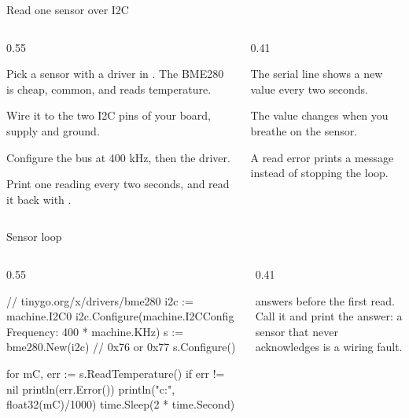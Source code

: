 \documentclass[10pt,aspectratio=169,t]{beamer}
\begin{document}
\begin{frame}[embedded,eyebrow=Task I]{Read one sensor over I2C}
  \begin{columns}[T]
    \begin{column}{0.55\textwidth}
      \begin{steps}
        \item Pick a sensor with a driver in . The BME280 is cheap, common, and reads temperature.
        \item Wire it to the two I2C pins of your board, supply and ground.
        \item Configure the bus at 400 kHz, then the driver.
        \item Print one reading every two seconds, and read it back with .
      \end{steps}
    \end{column}
    \begin{column}{0.41\textwidth}
      \begin{checklist}
        \item The serial line shows a new value every two seconds.
        \item The value changes when you breathe on the sensor.
        \item A read error prints a message instead of stopping the loop.
      \end{checklist}
    \end{column}
  \end{columns}
\end{frame}

\begin{frame}[embedded,fragile,eyebrow=Task I]{Sensor loop}
  \begin{columns}[T]
    \begin{column}{0.55\textwidth}
\begin{golang}
// tinygo.org/x/drivers/bme280
i2c := machine.I2C0
i2c.Configure(machine.I2CConfig{
    Frequency: 400 * machine.KHz})
s := bme280.New(i2c)  // 0x76 or 0x77
s.Configure()

for {
    mC, err := s.ReadTemperature()
    if err != nil { println(err.Error()) }
    println("c:", float32(mC)/1000)
    time.Sleep(2 * time.Second)
}
\end{golang}
    \end{column}
    \begin{column}{0.41\textwidth}
      \begin{warning}
         answers before the first read. Call it and print the answer: a sensor that never acknowledges is a wiring fault.
      \end{warning}
    \end{column}
  \end{columns}
\end{frame}
\end{document}
